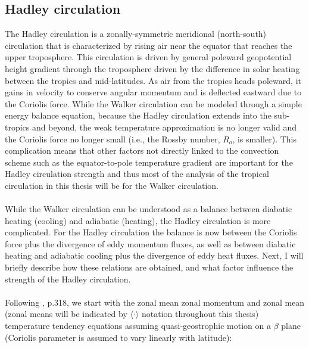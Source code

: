 \documentclass[letterpaper,12pt,titlepage,oneside,final]{book}
\begin{document}
\subsection{Hadley circulation}

The Hadley circulation is a zonally-symmetric meridional (north-south) circulation that is characterized by rising air near the equator that reaches the upper troposphere. This circulation is driven by general poleward geopotential height gradient through the troposphere driven by the difference in solar heating between the tropics and mid-latitudes. As air from the tropics heads poleward, it gains in velocity to conserve angular momentum and is deflected eastward due to the Coriolis force. While the Walker circulation can be modeled through a simple energy balance equation, because the Hadley circulation extends into the sub-tropics and beyond, the weak temperature approximation is no longer valid and the Coriolis force no longer small (i.e., the Rossby number, $R_{o}$, is smaller). This complication means that other factors not directly linked to the convection scheme such as the equator-to-pole temperature gradient are important for the Hadley circulation strength and thus most of the analysis of the tropical circulation in this thesis will be for the Walker circulation.
\\
\\
While the Walker circulation can be understood as a balance between diabatic heating (cooling) and adiabatic (heating), the Hadley circulation is more complicated. For the Hadley circulation the balance is now between the Coriolis force plus the divergence of eddy momentum fluxes, as well as between diabatic heating and adiabatic cooling plus the divergence of eddy heat fluxes. Next, I will briefly describe how these relations are obtained, and what factor influence the strength of the Hadley circulation. 
\\
\\
Following \cite{holton_introduction_2004}, p.318, we start with the zonal mean zonal momentum and zonal mean (zonal means will be indicated by $\langle \cdot \rangle$ notation throughout this thesis) temperature tendency equations assuming quasi-geostrophic motion on a $\beta$ plane (Coriolis parameter is assumed to vary linearly with latitude):
\end{document}

